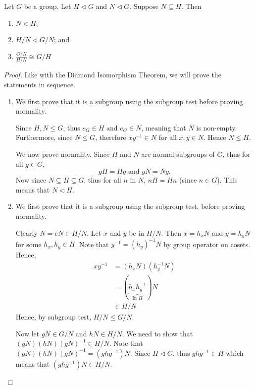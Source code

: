 \begin{theorem}\label{thrm-third-isomorphism}
    Let $G$ be a group. Let $H \lhd G$ and $N \lhd G$. Suppose $N \subseteq H$. Then
    \begin{enumerate}
        \item $N \lhd H$;
        \item $H/N \lhd G/N$; and
        \item $\frac{G/N}{H/N} \cong G/H$
    \end{enumerate}
\end{theorem}
\begin{proof}
    Like with the Diamond Isomorphism Theorem, we will prove the statements in sequence.

    \begin{enumerate}
        \item We first prove that it is a subgroup using the subgroup test before proving normality.

        Since $H, N \leq G$, thus $e_G \in H$ and $e_G \in N$, meaning that $N$ is non-empty. Furthermore, since $N \leq G$, therefore $xy^{-1} \in N$ for all $x, y \in N$. Hence $N \leq H$.

        We now prove normality. Since $H$ and $N$ are normal subgroups of $G$, thus for all $g \in G$,
        \[
            gH = Hg \text{ and } gN = Ng.
        \]
        Now since $N \subseteq H \subseteq G$, thus for all $n$ in $N$, $nH = Hn$ (since $n \in G$). This means that $N \lhd H$.

        \item We first prove that it is a subgroup using the subgroup test, before proving normality.

        Clearly $N = eN \in H/N$. Let $x$ and $y$ be in $H/N$. Then $x=h_xN$ and $y=h_yN$ for some $h_x, h_y \in H$. Note that $y^{-1} = (h_y)^{-1}N$ by group operator on cosets. Hence,
        \begin{align*}
            xy^{-1} &= (h_xN)(h_y^{-1}N)\\
            &= (\underbrace{h_xh_y^{-1}}_{\text{In }H})N\\
            &\in H/N
        \end{align*}
        Hence, by subgroup test, $H/N \leq G/N$.

        Now let $gN \in G/N$ and $hN \in H/N$. We need to show that $(gN)(hN)(gN)^{-1} \in H/N$. Note that $(gN)(hN)(gN)^{-1} = (ghg^{-1})N$. Since $H \lhd G$, thus $ghg^{-1} \in H$ which means that $(ghg^{-1})N \in H/N$.


\end{enumerate}
\end{proof}
